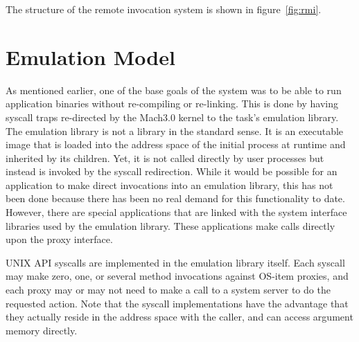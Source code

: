 The structure of the remote invocation
system is shown in figure~\ref{fig:rmi}.

\section{Emulation Model}
As mentioned earlier, one of the base goals of the system was to be able to
run application binaries without re-compiling or re-linking.  This is done
by having syscall traps re-directed by the Mach3.0 kernel to
the task's emulation library.  The emulation library is not a library in the
standard sense.  It is an executable image that is
loaded into the address space of the
initial process at runtime and inherited by its children.
Yet, it is not called directly by user processes but instead
is invoked by the syscall redirection.  While it would be possible for
an application to make
direct invocations into an emulation library, this has not been done because
there has been no real demand for this functionality to date.
However, there are special applications that
are linked with the system interface
libraries used by the emulation library.  These applications make calls
directly upon the proxy interface.

UNIX API syscalls are implemented in the emulation library itself.  Each
syscall may make zero, one, or several method invocations
against OS-item proxies, and each proxy may or may not need to make a call
to a system server to do the requested action.
Note that the syscall implementations have the advantage that
they actually reside in the address space with the caller, and can access
argument memory directly.

